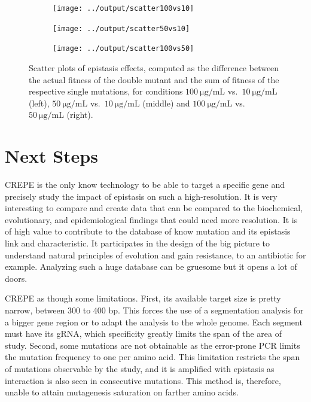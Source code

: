 \documentclass[12pt]{article}
\begin{document}
  \begin{figure}[!ht]
    \begin{subfigure}{.33\textwidth}
      \centering
      \texttt{[image: ../output/scatter100vs10]}
    \end{subfigure}
    \begin{subfigure}{.33\textwidth}
      \centering
      \texttt{[image: ../output/scatter50vs10]}
    \end{subfigure}
    \begin{subfigure}{.33\textwidth}
      \centering
      \texttt{[image: ../output/scatter100vs50]}
    \end{subfigure}
    \caption{Scatter plots of epistasis effects, computed as the difference
    between the actual fitness of the double mutant and the sum of fitness of
    the respective single mutations, for conditions
    $\SI{100}{\micro\gram\per\milli\liter}$ vs.\
    $\SI{10}{\micro\gram\per\milli\liter}$ (left),
    $\SI{50}{\micro\gram\per\milli\liter}$ vs.\
    $\SI{10}{\micro\gram\per\milli\liter}$ (middle) and
    $\SI{100}{\micro\gram\per\milli\liter}$ vs.\
    $\SI{50}{\micro\gram\per\milli\liter}$ (right).}%
    \label{fig:epicompare}
  \end{figure}

  \section{Next Steps}

  CREPE is the only know technology to be able to target a specific gene and
  precisely study the impact of epistasis on such a high-resolution. It is very
  interesting to compare and create data that can be compared to the biochemical,
  evolutionary, and epidemiological findings that could need more resolution. It
  is of high value to contribute to the database of know mutation and its
  epistasis link and characteristic. It participates in the design of the big
  picture to understand natural principles of evolution and gain resistance, to
  an antibiotic for example. Analyzing such a huge database can be gruesome but
  it opens a lot of doors.

  CREPE as though some limitations. First, its available target size is pretty
  narrow, between 300 to 400 bp. This forces the use of a segmentation analysis
  for a bigger gene region or to adapt the analysis to the whole genome. Each
  segment must have its gRNA, which specificity greatly limits the span of the
  area of study. Second, some mutations are not obtainable as the error-prone PCR
  limits the mutation frequency to one per amino acid. This limitation restricts
  the span of mutations observable by the study, and it is amplified with
  epistasis as interaction is also seen in consecutive mutations. This method is,
  therefore, unable to attain mutagenesis saturation on farther amino acids. 
\end{document}
